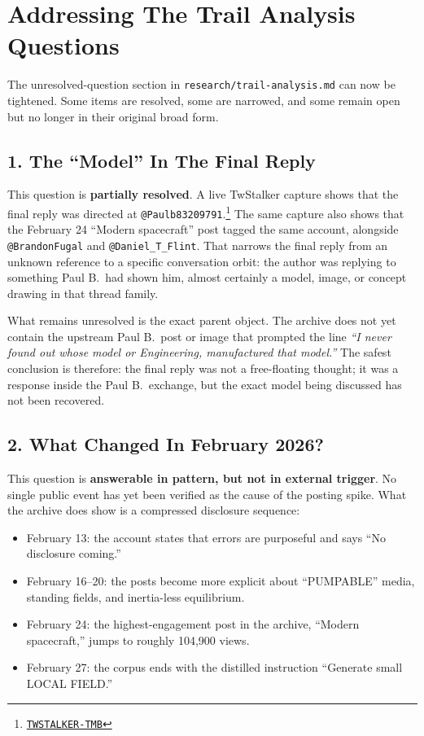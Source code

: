 \documentclass[11pt]{article}
\newcommand{\src}[2]{\href{#1}{\texttt{#2}}}
\begin{document}
\section{Addressing The Trail Analysis Questions}

The unresolved-question section in \texttt{research/trail-analysis.md} can now be tightened. Some items are resolved, some are narrowed, and some remain open but no longer in their original broad form.

\subsection{1. The ``Model'' In The Final Reply}

This question is \textbf{partially resolved}. A live TwStalker capture shows that the final reply was directed at \texttt{@Paulb83209791}.\footnote{\src{https://twstalker.com/TMBSPACESHIPS}{TWSTALKER-TMB}} The same capture also shows that the February 24 ``Modern spacecraft'' post tagged the same account, alongside \texttt{@BrandonFugal} and \texttt{@Daniel\_T\_Flint}. That narrows the final reply from an unknown reference to a specific conversation orbit: the author was replying to something Paul B.\ had shown him, almost certainly a model, image, or concept drawing in that thread family.

What remains unresolved is the exact parent object. The archive does not yet contain the upstream Paul B.\ post or image that prompted the line \emph{``I never found out whose model or Engineering, manufactured that model.''} The safest conclusion is therefore: the final reply was not a free-floating thought; it was a response inside the Paul B.\ exchange, but the exact model being discussed has not been recovered.

\subsection{2. What Changed In February 2026?}

This question is \textbf{answerable in pattern, but not in external trigger}. No single public event has yet been verified as the cause of the posting spike. What the archive does show is a compressed disclosure sequence:

\begin{itemize}
  \item February 13: the account states that errors are purposeful and says ``No disclosure coming.''
  \item February 16--20: the posts become more explicit about ``PUMPABLE'' media, standing fields, and inertia-less equilibrium.
  \item February 24: the highest-engagement post in the archive, ``Modern spacecraft,'' jumps to roughly 104{,}900 views.
  \item February 27: the corpus ends with the distilled instruction ``Generate small LOCAL FIELD.''
\end{itemize}
\end{document}

